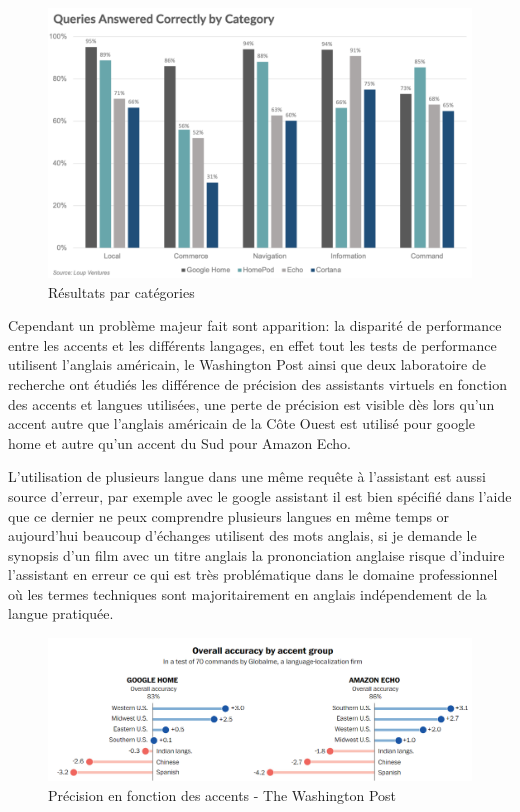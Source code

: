 \begin{figure}[H]
    \centering
    \includegraphics[width=1.0\textwidth]{Images/vaquerybycategory}
    \caption{Résultats par catégories}
    \label{fig:watsonlogo}
\end{figure}

Cependant un problème majeur fait sont apparition: la disparité de performance entre les accents
et les différents langages, en effet tout les tests de performance utilisent l'anglais américain,
le Washington Post ainsi que deux laboratoire de recherche ont étudiés les différence
de précision des assistants virtuels en fonction des accents et langues utilisées, une
perte de précision est visible dès lors qu'un accent autre que l'anglais américain de la Côte Ouest
est utilisé pour google home et autre qu'un accent du Sud pour Amazon Echo. \newline

L'utilisation de plusieurs langue dans une même requête à l'assistant est aussi source 
d'erreur, par exemple avec le google assistant il est bien spécifié dans l'aide 
que ce dernier ne peux comprendre plusieurs langues en même temps or aujourd'hui beaucoup
d'échanges utilisent des mots anglais, si je demande le synopsis d'un film avec 
un titre anglais la prononciation anglaise risque d'induire l'assistant en erreur ce qui
est très problématique dans le domaine professionnel où les termes techniques 
sont majoritairement en anglais indépendement de la langue pratiquée. 



\begin{figure}[H]
    \centering
    \includegraphics[width=1.0\textwidth]{Images/accuracyperaccent}
    \caption{Précision en fonction des accents - The Washington Post}
    \label{fig:accentaccuracy}
\end{figure}

